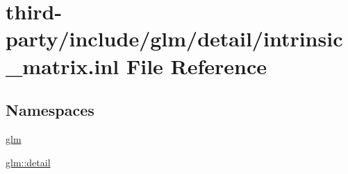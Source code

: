 \hypertarget{intrinsic__matrix_8inl}{}\section{third-\/party/include/glm/detail/intrinsic\+\_\+matrix.inl File Reference}
\label{intrinsic__matrix_8inl}
\subsection*{Namespaces}
\begin{DoxyCompactItemize}
\item 
 \hyperlink{namespaceglm}{glm}
\item 
 \hyperlink{namespaceglm_1_1detail}{glm\+::detail}
\end{DoxyCompactItemize}
